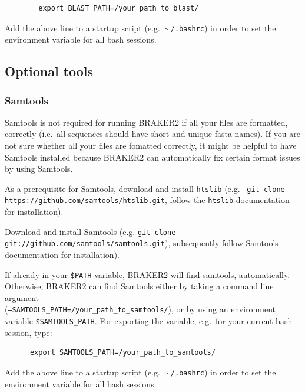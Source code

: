 \documentclass[a4paper,10pt]{report}
\begin{document}
    \begin{verbatim}
        export BLAST_PATH=/your_path_to_blast/ 
    \end{verbatim} 

    Add the above line to a startup script (e.g.~\texttt{$\sim$/.bashrc}) in order to set the environment variable for all bash sessions.




\subsection{Optional tools}

\subsubsection{Samtools}

Samtools is not required for running BRAKER2 if all your files are formatted, correctly (i.e.~all sequences should have short and unique fasta names). If you are not sure
      whether all your files are fomatted correctly, it might be helpful to have Samtools
      installed because BRAKER2 can automatically fix certain format issues by using Samtools. 

      As a prerequisite for Samtools, download and install \texttt{htslib} (e.g.~ 
      \texttt{git clone \url{https://github.com/samtools/htslib.git}}, follow the \texttt{htslib} documentation for 
      installation).

      Download and install Samtools (e.g. \texttt{git clone \url{git://github.com/samtools/samtools.git}}), 
      subsequently follow Samtools documentation for installation).    

      If already in your \texttt{\$PATH} variable, BRAKER2 will find samtools, automatically. Otherwise, BRAKER2 can find Samtools either by taking a command line argument\\ (\texttt{--SAMTOOLS\_PATH=/your\_path\_to\_samtools/}), or by using an environment variable \texttt{\$SAMTOOLS\_PATH}. For exporting the variable, e.g.~for your current bash session, type:

    \begin{verbatim}
      export SAMTOOLS_PATH=/your_path_to_samtools/
    \end{verbatim}
    
        Add the above line to a startup script (e.g.~\texttt{$\sim$/.bashrc}) in order to set the environment variable for all bash sessions.
        
\end{document}

